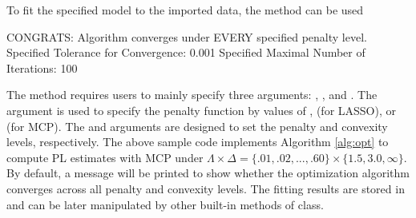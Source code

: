\documentclass[nojss]{jss}
\begin{document}
To fit the specified model to the imported data, the  method can be used
\begin{Schunk}
\begin{Soutput}
CONGRATS: Algorithm converges under EVERY specified penalty level.
  Specified Tolerance for Convergence: 0.001 
  Specified Maximal Number of Iterations: 100 
\end{Soutput}
\end{Schunk}
The  method requires users to mainly specify three arguments: , , and . The  argument is used to specify the penalty function by values of ,  (for LASSO), or  (for MCP). The  and  arguments are designed to set the penalty and convexity levels, respectively. The above sample code implements Algorithm \ref{alg:opt} to compute PL estimates with MCP under $\Lambda \times \Delta=\{.01,.02,...,.60\} \times \{1.5,3.0, \infty\}$. By default, a message will be printed to show whether the optimization algorithm converges across all penalty and convexity levels. The fitting results are stored in  and can be later manipulated by other built-in methods of  class. 
\end{document}
